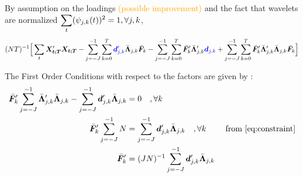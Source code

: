 \documentclass[main_document.tex]{subfiles}
\begin{document}
	By assumption on the loadings \textcolor{orange}{(possible improvement)} and the fact that wavelets are normalized $ \sum_{t}(\wavelet{j}{k}{t})^{2} = 1, \forall j,k$, 
\small
	\begin{align*}
	 (NT)^{-1} \Big[ \sum_t \X{t}'\X{t} - \scalesum{j} \locsum{k} \textcolor{blue}{\coeffs{j}{k}'} \optLoadings{j}{k}\optFactors{k}
		-\scalesum{j} \locsum{k} \optFactors{k}'\optLoadings{j}{k}' \textcolor{blue}{\coeffs{j}{k}} 
	       +  \scalesum{j} \locsum{k} \optFactors{k}'\optLoadings{j}{k}'\optLoadings{j}{k}\optFactors{k} \Big]
	\end{align*}
\normalsize    

The First Order Conditions with respect to the factors are given by : 
	\begin{align}
		\optFactors{k}' \scalesum{j} \optLoadings{j}{k}'\optLoadings{j}{k} - \scalesum{j} \coeffs{j}{k}' \optLoadings{j}{k} &= 0 \quad, \forall k \nonumber\\
		\optFactors{k}' \scalesum{j} N &= \scalesum{j} \coeffs{j}{k}' \optLoadings{j}{k} \quad, \forall k &\text{ from } \eqref{eq:constraint} \nonumber \\
		\optFactors{k}'  &= (JN)^{-1}\scalesum{j} \coeffs{j}{k}' \optLoadings{j}{k} \label{eq:optimalFactors}
	\end{align}

 
\end{document}
